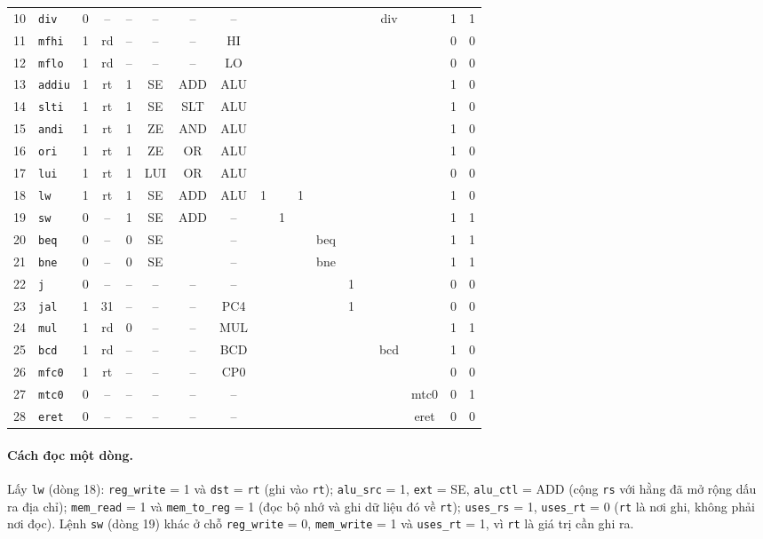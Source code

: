 {\begin{longtable}{@{}r l *{16}{c}@{}}
10 & \texttt{div} & 0 & -- & -- & -- & -- & -- &  &  &  &  &  &  & div &  & 1 & 1 \\
11 & \texttt{mfhi} & 1 & rd & -- & -- & -- & HI &  &  &  &  &  &  &  &  & 0 & 0 \\
12 & \texttt{mflo} & 1 & rd & -- & -- & -- & LO &  &  &  &  &  &  &  &  & 0 & 0 \\
13 & \texttt{addiu} & 1 & rt & 1 & SE & ADD & ALU &  &  &  &  &  &  &  &  & 1 & 0 \\
14 & \texttt{slti} & 1 & rt & 1 & SE & SLT & ALU &  &  &  &  &  &  &  &  & 1 & 0 \\
15 & \texttt{andi} & 1 & rt & 1 & ZE & AND & ALU &  &  &  &  &  &  &  &  & 1 & 0 \\
16 & \texttt{ori} & 1 & rt & 1 & ZE & OR & ALU &  &  &  &  &  &  &  &  & 1 & 0 \\
17 & \texttt{lui} & 1 & rt & 1 & LUI & OR & ALU &  &  &  &  &  &  &  &  & 0 & 0 \\
18 & \texttt{lw} & 1 & rt & 1 & SE & ADD & ALU & 1 &  & 1 &  &  &  &  &  & 1 & 0 \\
19 & \texttt{sw} & 0 & -- & 1 & SE & ADD & -- &  & 1 &  &  &  &  &  &  & 1 & 1 \\
20 & \texttt{beq} & 0 & -- & 0 & SE &  & -- &  &  &  & beq &  &  &  &  & 1 & 1 \\
21 & \texttt{bne} & 0 & -- & 0 & SE &  & -- &  &  &  & bne &  &  &  &  & 1 & 1 \\
22 & \texttt{j} & 0 & -- & -- & -- & -- & -- &  &  &  &  & 1 &  &  &  & 0 & 0 \\
23 & \texttt{jal} & 1 & 31 & -- & -- & -- & PC4 &  &  &  &  & 1 &  &  &  & 0 & 0 \\
24 & \texttt{mul} & 1 & rd & 0 & -- & -- & MUL &  &  &  &  &  &  &  &  & 1 & 1 \\
25 & \texttt{bcd} & 1 & rd & -- & -- & -- & BCD &  &  &  &  &  &  & bcd &  & 1 & 0 \\
26 & \texttt{mfc0} & 1 & rt & -- & -- & -- & CP0 &  &  &  &  &  &  &  &  & 0 & 0 \\
27 & \texttt{mtc0} & 0 & -- & -- & -- & -- & -- &  &  &  &  &  &  &  & mtc0 & 0 & 1 \\
28 & \texttt{eret} & 0 & -- & -- & -- & -- & -- &  &  &  &  &  &  &  & eret & 0 & 0 \\
\end{longtable}
}

\paragraph{Cách đọc một dòng.} Lấy \texttt{lw} (dòng 18): \texttt{reg\_write} = 1 và \texttt{dst} = \texttt{rt} (ghi vào \texttt{rt}); \texttt{alu\_src} = 1, \texttt{ext} = SE, \texttt{alu\_ctl} = ADD (cộng \texttt{rs} với hằng đã mở rộng dấu ra địa chỉ); \texttt{mem\_read} = 1 và \texttt{mem\_to\_reg} = 1 (đọc bộ nhớ và ghi dữ liệu đó về \texttt{rt}); \texttt{uses\_rs} = 1, \texttt{uses\_rt} = 0 (\texttt{rt} là nơi ghi, không phải nơi đọc). Lệnh \texttt{sw} (dòng 19) khác ở chỗ \texttt{reg\_write} = 0, \texttt{mem\_write} = 1 và \texttt{uses\_rt} = 1, vì \texttt{rt} là giá trị cần ghi ra.

